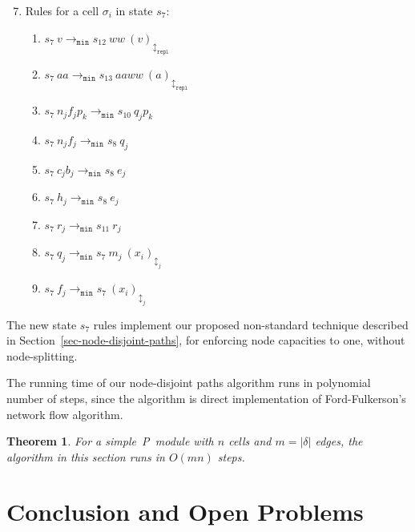 \documentclass[preliminary,copyright,creativecommons]{eptcs}
\newtheorem{theorem}{Theorem}
\theoremstyle{remark}
\newcommand{\modmin}{\mathtt{min}}
\newcommand{\modrepl}{\mathtt{repl}}
\begin{document}
  \begin{enumerate}
  \setcounter{enumi}{6}
  \item Rules for a cell $\sigma_i$ in state $s_7$:
    \begin{enumerate}[1]

    \item $s_7~ v \rightarrow_{\modmin} s_{12}~ w w~ (v)_{\updownarrow_\modrepl}$
    \item $s_7~ a a \rightarrow_{\modmin} s_{13}~ a a w w~ (a)_{\updownarrow_{\modrepl}}$

    \item $s_7~ n_j f_j p_k \rightarrow_{\modmin} s_{10}~ q_j p_k$
    \item $s_7~ n_j f_j \rightarrow_{\modmin} s_8~ q_j$
    \item $s_7~ c_j b_j \rightarrow_{\modmin} s_8~ e_j$

    \item $s_7~ h_j \rightarrow_{\modmin} s_8~ e_j$
    \item $s_7~ r_j \rightarrow_{\modmin} s_{11}~ r_j$

    \item $s_7~ q_j \rightarrow_{\modmin} s_7~ m_j~ (x_i)_{\updownarrow_j}$
    \item $s_7~ f_j \rightarrow_{\modmin} s_7~ (x_i)_{\updownarrow_j}$
    \end{enumerate}

  \end{enumerate}

The new state $s_7$ rules implement our proposed non-standard technique 
described in Section~\ref{sec-node-disjoint-paths}, 
for enforcing node capacities to one, 
without node-splitting.


\medskip

The running time of our node-disjoint paths algorithm runs in
polynomial number of steps, since the algorithm is 
direct implementation of Ford-Fulkerson's network flow algorithm.

\begin{theorem}
For a simple~P~module with $n$ cells and $m = |\delta|$ edges,
the algorithm in this section runs in $O(mn)$ steps.
\end{theorem}


\section{Conclusion and Open Problems}
\label{sec-conclusion}
\end{document}

